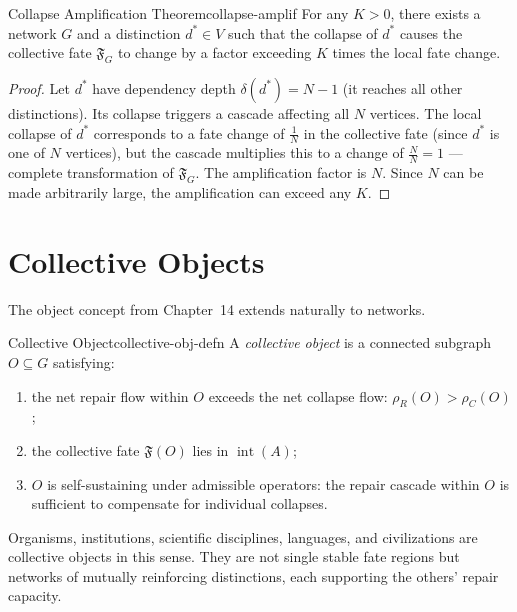 \documentclass[12pt,twoside,openright]{book}
\newcommand{\fateMap}{\mathfrak{F}}
\newcommand{\admRegion}{A}
\providecommand{\admRegion}{A}
\providecommand{\collapDens}[1]{\rho_{C}(#1)}
\providecommand{\repairDens}[1]{\rho_{R}(#1)}
\providecommand{\distNet}{G}
\providecommand{\distNetV}{V}
\providecommand{\collFate}{\mathfrak{F}_{G}}
\providecommand{\depDepth}[1]{\delta(#1)}
\begin{document}
\begin{theorem}{Collapse Amplification Theorem}{collapse-amplif}
For any $K>0$, there exists a network $\distNet$ and a
distinction $d^*\in\distNetV$ such that the collapse of $d^*$
causes the collective fate $\collFate$ to change by a factor
exceeding $K$ times the local fate change.
\begin{proof}
Let $d^*$ have dependency depth $\depDepth{d^*}=N-1$ (it
reaches all other distinctions). Its collapse triggers a
cascade affecting all $N$ vertices. The local collapse of
$d^*$ corresponds to a fate change of $\frac{1}{N}$ in the
collective fate (since $d^*$ is one of $N$ vertices), but the
cascade multiplies this to a change of $\frac{N}{N}=1$ ---
complete transformation of $\collFate$. The amplification
factor is $N$. Since $N$ can be made arbitrarily large, the
amplification can exceed any $K$.
\end{proof}
\end{theorem}

\section{Collective Objects}

The object concept from Chapter~14 extends naturally to
networks.

\begin{definition}{Collective Object}{collective-obj-defn}
A \emph{collective object} is a connected subgraph
$O\subseteq\distNet$ satisfying:
\begin{enumerate}[nosep,label=(\roman*)]
  \item the net repair flow within $O$ exceeds the net collapse
    flow: $\repairDens{O}>\collapDens{O}$;
  \item the collective fate $\fateMap(O)$ lies in
    $\operatorname{int}(\admRegion)$;
  \item $O$ is self-sustaining under admissible operators:
    the repair cascade within $O$ is sufficient to compensate
    for individual collapses.
\end{enumerate}
\end{definition}

Organisms, institutions, scientific disciplines, languages,
and civilizations are collective objects in this sense. They
are not single stable fate regions but networks of mutually
reinforcing distinctions, each supporting the others' repair
capacity.
\end{document}
